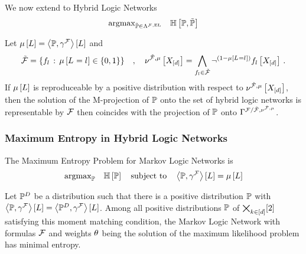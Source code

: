 We now extend to Hybrid Logic Networks
\begin{align*}
	\mathrm{argmax}_{\tilde{\mathbb{P}}\in\Lambda^{\mathcal{F},\mathrm{EL}}} \quad 
	\mathbb{H}\left[\mathbb{P},\tilde{\mathbb{P}}\right]	
\end{align*}



\begin{corollary}
	Let $\mu\left[L\right] = \left\langle \mathbb{P},\gamma^{\mathcal{F}}\right\rangle \left[ L \right]$ and
		\[ \tilde{\mathcal{F}} = \{f_{l} \, : \, \mu\left[L_{}=l_{}\right] \in \{0,1\}\} \quad , \quad 
		\nu^{\tilde{\mathcal{F}},\mu}\left[X_{[d]}\right] 
		= \bigwedge_{f_{l}\in\tilde{\mathcal{F}}} \lnot^{(1-\mu\left[L_{}=l_{}\right])} f_{l}\left[X_{[d]}\right]
		\, . \]
	If $\mu\left[L\right]$ is reproduceable by a positive distribution with respect to $\nu^{\tilde{\mathcal{F}},\mu}\left[X_{[d]}\right] $, then the solution of the M-projection of $\mathbb{P}$ onto the set of hybrid logic networks is representable by $\mathcal{F}$ then coincides with the projection of $\mathbb{P}$ onto $\Gamma^{\mathcal{F}/\tilde{\mathcal{F}},\nu^{\tilde{\mathcal{F}},\mu}}$.
\end{corollary}

\subsubsection{Maximum Entropy in Hybrid Logic Networks}


The Maximum Entropy Problem for Markov Logic Networks is
\begin{align}
	\mathrm{argmax}_{\mathbb{P}} \quad \mathbb{H}\left[\mathbb{P}\right] 
	\quad \text{subject to} \quad  
	\left\langle \mathbb{P},\gamma^{\mathcal{F}}\right\rangle \left[ L \right]
	 =  \mu\left[L\right] 
\end{align}



\begin{corollary}
	Let $\mathbb{P}^{D}$ be a distribution such that there is a positive distribution $\mathbb{P}$ with $\left\langle \mathbb{P},\gamma^{\mathcal{F}}\right\rangle \left[ L \right] = \left\langle \mathbb{P}^{D},\gamma^{\mathcal{F}}\right\rangle \left[ L \right]$.
	Among all positive distributions $\mathbb{P}$ of $\bigtimes_{k\in[d]}[2]$ satisfying this moment matching condition, the Markov Logic Network with formulas $\mathcal{F}$ and weights $\theta$ being the solution of the maximum likelihood problem has minimal entropy.
\end{corollary}

